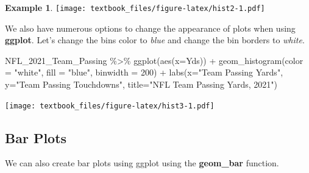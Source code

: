 \documentclass[
  11pt,
]{book}
\newenvironment{Shaded}{\begin{snugshade}}{\end{snugshade}}
\newcommand{\AttributeTok}[1]{\textcolor[rgb]{0.77,0.63,0.00}{#1}}
\newcommand{\DecValTok}[1]{\textcolor[rgb]{0.00,0.00,0.81}{#1}}
\newcommand{\FunctionTok}[1]{\textcolor[rgb]{0.00,0.00,0.00}{#1}}
\newcommand{\NormalTok}[1]{#1}
\newcommand{\SpecialCharTok}[1]{\textcolor[rgb]{0.00,0.00,0.00}{#1}}
\newcommand{\StringTok}[1]{\textcolor[rgb]{0.31,0.60,0.02}{#1}}
\theoremstyle{definition}
\theoremstyle{definition}
\newtheorem{example}{Example}[chapter]
\theoremstyle{definition}
\theoremstyle{definition}
\theoremstyle{remark}
\begin{document}
\begin{example}
\texttt{[image: textbook\_files/figure-latex/hist2-1.pdf]}

\vfill
\newpage

We also have numerous options to change the appearance of plots when using \textbf{ggplot}. Let's change the bins color to \emph{blue} and change the bin borders to \emph{white}.

\begin{Shaded}
\begin{Highlighting}[]
\NormalTok{NFL\_2021\_Team\_Passing }\SpecialCharTok{\%\textgreater{}\%} \FunctionTok{ggplot}\NormalTok{(}\FunctionTok{aes}\NormalTok{(}\AttributeTok{x=}\NormalTok{Yds)) }\SpecialCharTok{+} 
  \FunctionTok{geom\_histogram}\NormalTok{(}\AttributeTok{color =} \StringTok{"white"}\NormalTok{, }\AttributeTok{fill =} \StringTok{"blue"}\NormalTok{, }\AttributeTok{binwidth =} \DecValTok{200}\NormalTok{) }\SpecialCharTok{+}
  \FunctionTok{labs}\NormalTok{(}\AttributeTok{x=}\StringTok{"Team Passing Yards"}\NormalTok{,}
       \AttributeTok{y=}\StringTok{"Team Passing Touchdowns"}\NormalTok{,}
       \AttributeTok{title=}\StringTok{"NFL Team Passing Yards, 2021"}\NormalTok{)}
\end{Highlighting}
\end{Shaded}

\texttt{[image: textbook\_files/figure-latex/hist3-1.pdf]}
\end{example}

\vfill
\newpage

\hypertarget{bar-plots}{%
\subsection{Bar Plots}\label{bar-plots}}

We can also create bar plots using ggplot using the \textbf{geom\_bar} function.
\end{document}
